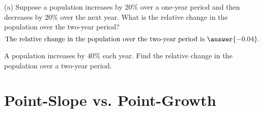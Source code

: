 \documentclass{ximera}
\begin{document}
\begin{question}  \label{Q2:ExponentialG}
(a) Suppose a population increases by $20\%$ over a one-year period and then decreases by $20\%$ over the next year. What is the relative change in the population over the two-year period?
\[
   \text{The relative change in the population over the two-year period is }   \answer{-0.04} .
\]

\end{question}

\begin{question}  \label{Q3:ExponentialG}
A population increases by $40\%$ each year. Find the relative change in the population over a two-year period. 
\begin{multipleChoice}  
\end{multipleChoice}  
\end{question}




\section{Point-Slope vs. Point-Growth}
\end{document}
